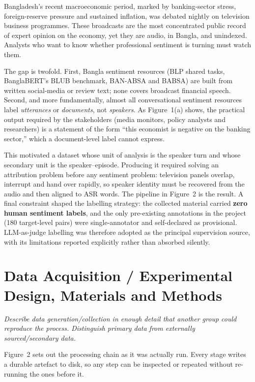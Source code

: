 \documentclass[11pt,a4paper]{article}
\begin{document}
Bangladesh's recent macroeconomic period, marked by banking-sector stress, foreign-reserve
pressure and sustained inflation, was debated nightly on television business programmes. These broadcasts
are the most concentrated public record of expert opinion on the economy, yet they are audio, in
Bangla, and unindexed. Analysts who want to know whether professional sentiment is turning must
watch them.

The gap is twofold. First, Bangla sentiment resources (BLP shared tasks, BanglaBERT's BLUB
benchmark, BAN-ABSA and BABSA) are built from written social-media or review text; none covers
broadcast financial speech. Second, and more fundamentally, almost all conversational sentiment
resources label \emph{utterances} or \emph{documents}, not \emph{speakers}. As Figure~1(a) shows,
the practical output required by the stakeholders (media monitors, policy analysts and
researchers) is a statement of the form ``this economist is negative on the banking sector,''
which a document-level label cannot express.

This motivated a dataset whose unit of analysis is the speaker turn and whose secondary unit is
the speaker--episode. Producing it required solving an attribution problem before any sentiment
problem: television panels overlap, interrupt and hand over rapidly, so speaker identity must be
recovered from the audio and then aligned to ASR words. The pipeline in Figure~2 is the
result. A final constraint shaped the labelling strategy: the collected material carried
\textbf{zero human sentiment labels}, and the only pre-existing annotations in the project (180
target-level pairs) were single-annotator and self-declared as provisional. LLM-as-judge
labelling was therefore adopted as the principal supervision source, with its limitations
reported explicitly rather than absorbed silently.

\section{Data Acquisition / Experimental Design, Materials and Methods}

\emph{\small Describe data generation/collection in enough detail that another group could
reproduce the process. Distinguish primary data from externally sourced/secondary data.}

Figure~2 sets out the processing chain as it was actually run. Every stage writes a
durable artefact to disk, so any step can be inspected or repeated without re-running the ones
before it.
\end{document}
